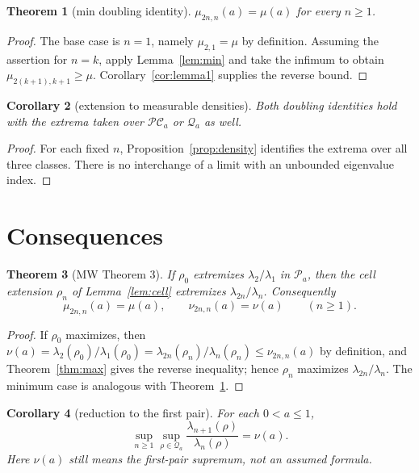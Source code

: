 ﻿\documentclass[11pt]{article}
\newtheorem{theorem}{Theorem}[section]
\newtheorem{corollary}[theorem]{Corollary}
\begin{document}
\begin{theorem}[min doubling identity]\label{thm:min}
 $\mu_{2n,n}(a)=\mu(a)$ for every $n\ge1$.
\end{theorem}

\begin{proof}
 The base case is $n=1$, namely $\mu_{2,1}=\mu$ by definition.
 Assuming the assertion for $n=k$, apply Lemma~\ref{lem:min} and take
 the infimum to obtain $\mu_{2(k+1),k+1}\ge\mu$.
 Corollary~\ref{cor:lemma1} supplies the reverse bound.
\end{proof}

\begin{corollary}[extension to measurable densities]\label{cor:measurable}
 Both doubling identities hold with the extrema taken over
 $\mathcal{PC}_a$ or $\mathcal Q_a$ as well.
\end{corollary}

\begin{proof}
 For each fixed $n$, Proposition~\ref{prop:density} identifies the
 extrema over all three classes. There is no interchange of a limit
 with an unbounded eigenvalue index.
\end{proof}

\section{Consequences}

\begin{theorem}[MW Theorem 3]\label{thm:theorem3}
	If $\rho_0$ extremizes $\lambda_2/\lambda_1$ in $\mathcal P_a$, then the
	cell extension $\rho_n$ of Lemma~\ref{lem:cell} extremizes
	$\lambda_{2n}/\lambda_n$.  Consequently
	\begin{equation*}
		\mu_{2n,n}(a)=\mu(a),\qquad
		\nu_{2n,n}(a)=\nu(a)\qquad(n\ge 1).
	\end{equation*}
\end{theorem}

\begin{proof}
	If $\rho_0$ maximizes, then $\nu(a)=\lambda_2(\rho_0)/\lambda_1(\rho_0)
	=\lambda_{2n}(\rho_n)/\lambda_n(\rho_n)\le\nu_{2n,n}(a)$ by definition,
	and Theorem~\ref{thm:max} gives the reverse inequality; hence $\rho_n$
	maximizes $\lambda_{2n}/\lambda_n$.  The minimum case is analogous with
	Theorem~\ref{thm:min}.
\end{proof}

\begin{corollary}[reduction to the first pair]\label{cor:sup}
 For each $0<a\le1$,
 \[
 \sup_{n\ge1}\sup_{\rho\in\mathcal Q_a}
 \frac{\lambda_{n+1}(\rho)}{\lambda_n(\rho)}=\nu(a).
 \]
 Here $\nu(a)$ still means the first-pair supremum, not an assumed formula.
\end{corollary}
\end{document}
